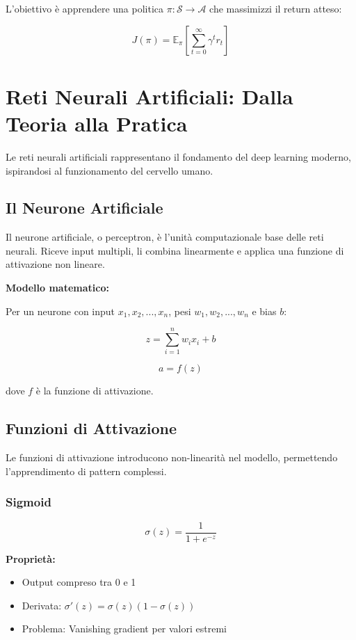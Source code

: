 \documentclass[12pt,a4paper,twoside]{report}
\begin{document}
L'obiettivo è apprendere una politica $\pi: \mathcal{S} \rightarrow \mathcal{A}$ che massimizzi il return atteso:

$$J(\pi) = \mathbb{E}_{\pi}[\sum_{t=0}^{\infty} \gamma^t r_t]$$

\section{Reti Neurali Artificiali: Dalla Teoria alla Pratica}

Le reti neurali artificiali rappresentano il fondamento del deep learning moderno, ispirandosi al funzionamento del cervello umano.

\subsection{Il Neurone Artificiale}

Il neurone artificiale, o perceptron, è l'unità computazionale base delle reti neurali. Riceve input multipli, li combina linearmente e applica una funzione di attivazione non lineare.

\textbf{Modello matematico:}

Per un neurone con input $x_1, x_2, ..., x_n$, pesi $w_1, w_2, ..., w_n$ e bias $b$:

$$z = \sum_{i=1}^{n} w_i x_i + b$$

$$a = f(z)$$

dove $f$ è la funzione di attivazione.

\subsection{Funzioni di Attivazione}

Le funzioni di attivazione introducono non-linearità nel modello, permettendo l'apprendimento di pattern complessi.

\subsubsection{Sigmoid}
$$\sigma(z) = \frac{1}{1 + e^{-z}}$$

\textbf{Proprietà:}
\begin{itemize}
    \item Output compreso tra 0 e 1
    \item Derivata: $\sigma'(z) = \sigma(z)(1 - \sigma(z))$
    \item Problema: Vanishing gradient per valori estremi
\end{itemize}
\end{document}
